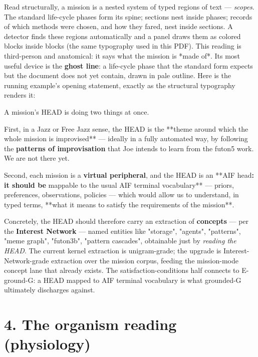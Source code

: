 \documentclass[11pt,oneside]{article}
\begin{document}
Read structurally, a mission is a nested system of typed regions of text ---
\emph{scopes}. The standard life-cycle phases form its spine; sections nest inside
phases; records of which methods were chosen, and how they fared, nest inside
sections. A detector finds these regions automatically and a panel draws them
as colored blocks inside blocks (the same typography used in this PDF). This
reading is third-person and anatomical: it says what the mission is *made
of*. Its most useful device is the \textbf{ghost line}: a life-cycle phase that
the standard form expects but the document does not yet contain, drawn in
pale outline. Here is the running example's opening statement, exactly as the
structural typography renders it:

\begin{phasebox}[title={HEAD (Joe, 2026-06-10, verbatim sense)}]

A mission's HEAD is doing two things at once.

First, in a Jazz or Free Jazz sense, the HEAD is the **theme around which the
whole mission is improvised** --- ideally in a fully automated way, by following
the \textbf{patterns of improvisation} that Joe intends to learn from the futon5
work. We are not there yet.

Second, each mission is a \textbf{virtual peripheral}, and the HEAD is an **AIF
head\textbf{: it should be }mappable to the usual AIF terminal vocabulary** ---
priors, preferences, observations, policies --- which would allow us to
understand, in typed terms, **what it means to satisfy the requirements of
the mission**.

Concretely, the HEAD should therefore carry an extraction of \textbf{concepts} ---
per the \textbf{Interest Network} --- named entities like "storage", "agents",
"patterns", "meme graph", "futon3b", "pattern cascades", obtainable just by
\emph{reading the HEAD}. The current kernel extraction is unigram-grade; the
upgrade is Interest-Network-grade extraction over the mission corpus, feeding
the mission-mode concept lane that already exists. The satisfaction-conditions
half connects to E-ground-G: a HEAD mapped to AIF terminal vocabulary is what
grounded-G ultimately discharges against.

\end{phasebox}

\section*{4. The organism reading (physiology)}
\end{document}
